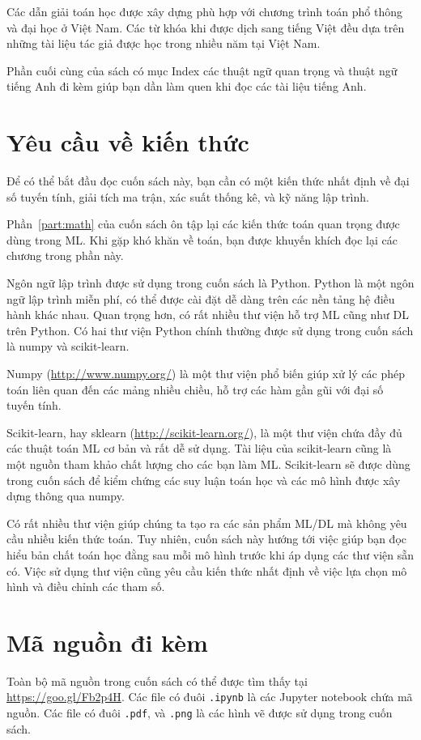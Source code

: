 Các dẫn giải toán học được xây dựng phù hợp với chương trình toán phổ thông và
đại học ở Việt Nam. Các từ khóa khi được dịch sang tiếng Việt đều dựa trên những
tài liệu tác giả được học trong nhiều năm tại Việt Nam.

Phần cuối cùng của sách có mục Index các thuật ngữ quan trọng và thuật ngữ tiếng Anh đi kèm giúp bạn dần làm quen khi đọc các tài liệu tiếng Anh.


\section{Yêu cầu về kiến thức}

Để có thể bắt đầu đọc cuốn sách này, bạn cần có một kiến thức nhất định về đại
số tuyến tính, giải tích ma trận, xác suất thống kê, và kỹ năng lập trình.

Phần~\ref{part:math} của cuốn sách ôn tập lại các kiến thức toán quan trọng được
dùng trong ML. Khi gặp khó khăn về toán, bạn được khuyến khích đọc lại các
chương trong phần này.

Ngôn ngữ lập trình được sử dụng trong cuốn sách là Python. Python là một ngôn
ngữ lập trình miễn phí, có thể được cài đặt dễ dàng trên các nền tảng hệ điều
hành khác nhau. Quan trọng hơn, có rất nhiều thư viện hỗ trợ ML cũng như DL
trên Python. Có hai thư viện Python chính thường được sử dụng trong
cuốn sách là numpy và scikit-learn.

Numpy (\url{http://www.numpy.org/}) là một thư viện phổ biến giúp xử lý các phép
toán liên quan đến các mảng nhiều chiều, hỗ trợ các hàm gần gũi với đại số tuyến
tính.

Scikit-learn, hay sklearn (\url{http://scikit-learn.org/}), là một thư viện chứa
đầy đủ các thuật toán ML cơ bản và rất dễ sử dụng. Tài liệu của scikit-learn
cũng là một nguồn tham khảo chất lượng cho các bạn làm ML. Scikit-learn sẽ được
dùng trong cuốn sách để kiểm chứng các suy luận toán học và các mô hình được xây
dựng thông qua numpy.

Có rất nhiều thư viện giúp chúng ta tạo ra các sản phẩm ML/DL mà không yêu
cầu nhiều kiến thức toán. Tuy nhiên, cuốn sách này hướng tới việc giúp bạn đọc
hiểu bản chất toán học đằng sau mỗi mô hình trước khi áp dụng các thư viện sẵn
có. Việc sử dụng thư viện cũng yêu cầu kiến thức nhất định về việc lựa chọn mô
hình và điều chỉnh các tham số.
\section{Mã nguồn đi kèm}
Toàn bộ mã nguồn trong cuốn sách có thể được tìm thấy tại
\url{https://goo.gl/Fb2p4H}. Các file có đuôi \texttt{.ipynb} là các
Jupyter notebook chứa mã nguồn. Các file có đuôi \texttt{.pdf}, và \texttt{.png}
là các hình vẽ được sử dụng trong cuốn sách.

